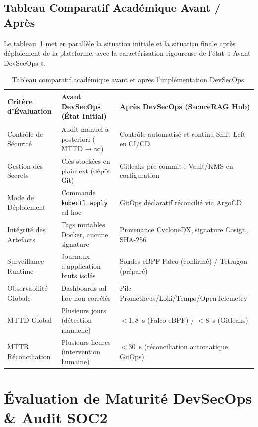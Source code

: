\subsection{Tableau Comparatif Académique Avant / Après}

Le tableau~\ref{tab:comparaison_avant_apres_full_sec} met en parallèle la situation initiale et la situation finale après déploiement de la plateforme, avec la caractérisation rigoureuse de l'état « Avant DevSecOps ».

\begin{table}[H]
\centering
\scriptsize
\begin{tabular}{@{}p{3cm}p{4.8cm}p{5.5cm}@{}}
\toprule
\textbf{Critère d'Évaluation} & \textbf{Avant DevSecOps (État Initial)} & \textbf{Après DevSecOps (SecureRAG Hub)} \\
\midrule
Contrôle de Sécurité & Audit manuel a posteriori ($\text{MTTD} \rightarrow \infty$) & Contrôle automatisé et continu Shift-Left en CI/CD \\
Gestion des Secrets & Clés stockées en plaintext (dépôt Git) & Gitleaks pre-commit ; Vault/KMS en configuration \\
Mode de Déploiement & Commande \texttt{kubectl apply} ad hoc & GitOps déclaratif réconcilié via ArgoCD \\
Intégrité des Artefacts & Tags mutables Docker, aucune signature & Provenance CycloneDX, signature Cosign, SHA-256 \\
Surveillance Runtime & Journaux d'application bruts isolés & Sondes eBPF Falco (confirmé) / Tetragon (préparé) \\
Observabilité Globale & Dashboards ad hoc non corrélés & Pile Prometheus/Loki/Tempo/OpenTelemetry \\
MTTD Global & Plusieurs jours (détection manuelle) & $< 1{,}8$~s (Falco eBPF) / $< 8$~s (Gitleaks) \\
MTTR Réconciliation & Plusieurs heures (intervention humaine) & $< 30$~s (réconciliation automatique GitOps) \\
\bottomrule
\end{tabular}
\caption{Tableau comparatif académique avant et après l'implémentation DevSecOps.}
\label{tab:comparaison_avant_apres_full_sec}
\end{table}



\section{Évaluation de Maturité DevSecOps \& Audit SOC2}
\label{sec:modele_maturite}

